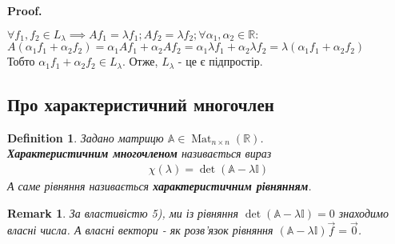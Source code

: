 \documentclass[a4paper, 10pt]{article}
\makeatletter
\theoremstyle{theoremdd}
\newtheorem{definition}[theorem]{Definition}
\newtheorem{remark}[theorem]{Remark}
\DeclareMathOperator{\Mat}{Mat}
\renewenvironment{proof}[1][Proof.\\]{\par
\pushQED{\hfill \qed}%
\normalfont \topsep6\p@\@plus6\p@\relax
\trivlist
\item\relax
{\bfseries
#1\@addpunct{.}}\hspace\labelsep\ignorespaces
}{%
\popQED\endtrivlist\@endpefalse
}
\makeatother
\begin{document}
\begin{proof}
$\forall f_1,f_2 \in L_{\lambda} \implies Af_1 = \lambda f_1; Af_2 = \lambda f_2; \forall \alpha_1, \alpha_2 \in \mathbb{R}:$\\
$A(\alpha_1 f_1 + \alpha_2 f_2) = \alpha_1 Af_1 + \alpha_2 Af_2 = \alpha_1 \lambda f_1 + \alpha_2 \lambda f_2 = \lambda (\alpha_1 f_1 + \alpha_2 f_2)$\\
Тобто $\alpha_1 f_1 + \alpha_2 f_2 \in L_{\lambda}$. Отже, $L_\lambda$ - це є підпростір.
\end{proof}

\subsection{Про характеристичний многочлен}
\begin{definition}
Задано матрицю $\mathbb{A} \in \Mat_{n \times n}(\mathbb{R})$.\\
\textbf{Характеристичним многочленом} називається вираз
\begin{align*}
\chi(\lambda) = \det(\mathbb{A} - \lambda \mathbb{I})
\end{align*}
А саме рівняння називається \textbf{характеристичним рівнянням}.
\end{definition}

\begin{remark}
За властивістю 5), ми із рівняння $\det (\mathbb{A} - \lambda \mathbb{I}) = 0$ знаходимо власні числа. А власні вектори - як розв'язок рівняння $(\mathbb{A} - \lambda \mathbb{I})\vec{f} = \vec{0}$.
\end{remark}
\end{document}
